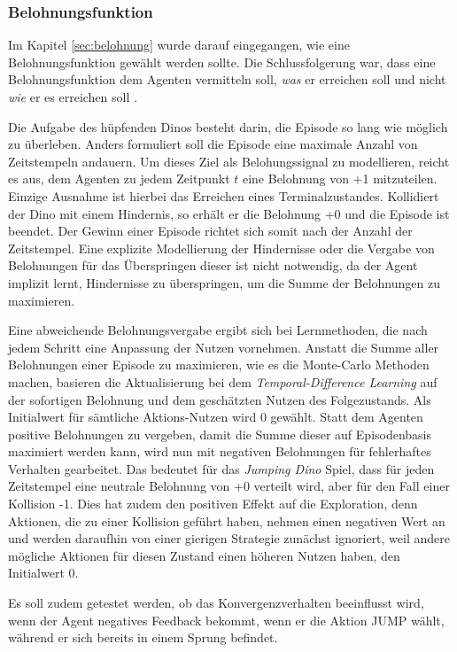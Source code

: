 \subsubsection{Belohnungsfunktion}\label{sec:JDbelohnungsfunktion}
Im Kapitel \ref{sec:belohnung} wurde darauf eingegangen, wie eine Belohnungsfunktion gewählt werden sollte. Die Schlussfolgerung war, dass eine Belohnungsfunktion dem Agenten vermitteln soll, \textit{was} er erreichen soll und nicht \textit{wie} er es erreichen soll \cite[S.~54]{Sutton1998}.
\par 
Die Aufgabe des hüpfenden Dinos besteht darin, die Episode so lang wie möglich zu überleben. Anders formuliert soll die Episode eine maximale Anzahl von Zeitstempeln andauern. Um dieses Ziel als Belohungssignal zu modellieren, reicht es aus, dem Agenten zu jedem Zeitpunkt $t$ eine Belohnung von +1 mitzuteilen. Einzige Ausnahme ist hierbei das Erreichen eines Terminalzustandes. Kollidiert der Dino mit einem Hindernis, so erhält er die Belohnung +0 und die Episode ist beendet. Der Gewinn einer Episode richtet sich somit nach der Anzahl der Zeitstempel. Eine explizite Modellierung der Hindernisse oder die Vergabe von Belohnungen für das Überspringen dieser ist nicht notwendig, da der Agent implizit lernt, Hindernisse zu überspringen, um die Summe der Belohnungen zu maximieren. 
\par 
Eine abweichende Belohnungsvergabe ergibt sich bei Lernmethoden, die nach jedem Schritt eine Anpassung der Nutzen vornehmen. Anstatt die Summe aller Belohnungen einer Episode zu maximieren, wie es die Monte-Carlo Methoden machen, basieren die Aktualisierung bei dem \textit{Temporal-Difference Learning} auf der sofortigen Belohnung und dem geschätzten Nutzen des Folgezustands. Als Initialwert für sämtliche Aktions-Nutzen wird 0 gewählt. Statt dem Agenten positive Belohnungen zu vergeben, damit die Summe dieser auf Episodenbasis maximiert werden kann, wird nun mit negativen Belohnungen für fehlerhaftes Verhalten gearbeitet. Das bedeutet für das \textit{Jumping Dino} Spiel, dass für jeden Zeitstempel eine neutrale Belohnung von +0 verteilt wird, aber für den Fall einer Kollision -1. Dies hat zudem den positiven Effekt auf die Exploration, denn Aktionen, die zu einer Kollision geführt haben, nehmen einen negativen Wert an und werden daraufhin von einer gierigen Strategie zunächst ignoriert, weil andere mögliche Aktionen für diesen Zustand einen höheren Nutzen haben, den Initialwert 0.
\par 
Es soll zudem getestet werden, ob das Konvergenzverhalten beeinflusst wird, wenn der Agent negatives Feedback bekommt, wenn er die Aktion JUMP wählt, während er sich bereits in einem Sprung befindet. 
